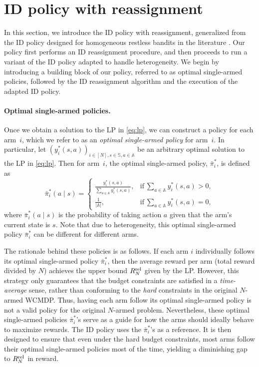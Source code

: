 \documentclass{article}
\theoremstyle{plain}
\theoremstyle{remark}
\newcommand{\sspa}{\mathbb{S}}
\newcommand{\aspa}{\mathbb{A}}
\newcommand{\rel}{\textup{rel}} %
\newcommand{\pibar}{{\sysbar{\pi}}}
\newcommand{\sysbar}[1]{\bar{#1}}
\newcommand{\cardA}{\lvert\aspa\rvert}
\begin{document}
\section{ID policy with reassignment}
In this section, we introduce the ID policy with reassignment, generalized from the ID policy designed for homogeneous restless bandits in the literature \citep{HonXieChe_24}.
Our policy first performs an ID reassignment procedure, and then proceeds to run a variant of the ID policy adapted to handle heterogeneity.
We begin by introducing a building block of our policy, referred to as optimal single-armed policies, followed by the ID reassignment algorithm and the execution of the adapted ID policy.



\paragraph{Optimal single-armed policies.}
Once we obtain a solution to the LP in \eqref{eq:lp}, we can construct a policy for each arm~$i$, which we refer to as an \emph{optimal single-armed policy} for arm~$i$.
In particular, let $(y^*_i(s,a))_{i\in [N], s\in\sspa,a\in\aspa}$ be an arbitrary optimal solution to the LP in \eqref{eq:lp}. 
Then for arm~$i$, the optimal single-armed policy, $\pibar^*_i$, is defined as
\begin{equation}\label{eq:optimal-single-armed-policy}
    \bar{\pi}_i^*(a\mid s) = \begin{cases}
        \frac{y^*_i(s,a)}{\sum_{a\in\aspa}y^*_i(s,a)}, & \text{if}~ \sum_{a\in\aspa}y^*_i(s,a) >0,\\
        \frac{1}{\cardA}, &  \text{if} ~\sum_{a\in\aspa}y^*_i(s,a)=0,
    \end{cases}
\end{equation}
where $\bar{\pi}_i^*(a\mid s)$ is the probability of taking action $a$ given that the arm's current state is $s$.
Note that due to heterogeneity, this optimal single-armed policy $\pibar^*_i$ can be different for different arms.


The rationale behind these policies is as follows.
If each arm $i$ individually follows its optimal single-armed policy $\pibar_i^*$, then the average reward per arm (total reward divided by $N$) achieves the upper bound $R_N^{\rel}$ given by the LP.
However, this strategy only guarantees that the budget constraints are satisfied in a \emph{time-average} sense, rather than conforming to the \emph{hard} constraints in the original $N$-armed WCMDP.
Thus, having each arm follow its optimal single-armed policy is not a valid policy for the original $N$-armed problem.
Nevertheless, these optimal single-armed policies $\pibar_i^*$'s serve as a guide for how the arms should ideally behave to maximize rewards.
The ID policy uses the $\pibar_i^*$'s as a reference.
It is then designed to ensure that even under the hard budget constraints, most arms follow their optimal single-armed policies most of the time, yielding a diminishing gap to $R_N^{\rel}$ in reward.
\end{document}
